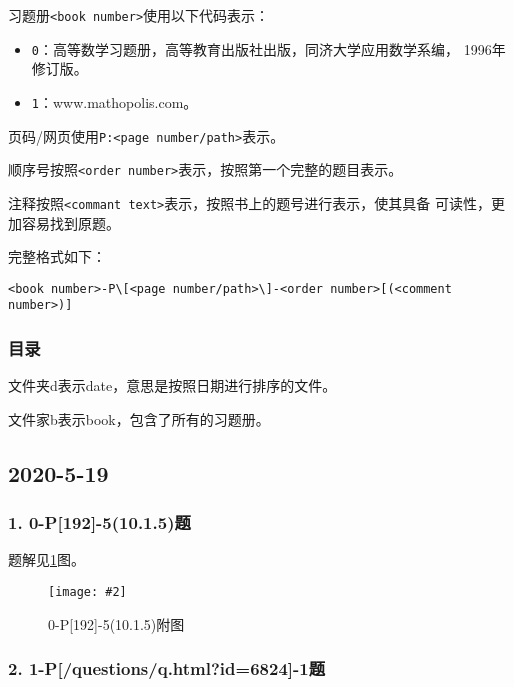 \documentclass[12pt,a4paper,]{article}
\providecommand{\tightlist}{%
  \setlength{\itemsep}{0pt}\setlength{\parskip}{0pt}}
\newcommand{\pic}[4]{
    \begin{figure}[htbp]
    \centering
    \texttt{[image: \#2]}
    \caption{#3}
    \label{#4}
    \end{figure}
}
\begin{document}
习题册\texttt{\textless{}book\ number\textgreater{}}使用以下代码表示：

\begin{itemize}
\tightlist
\item
  \texttt{0}：高等数学习题册，高等教育出版社出版，同济大学应用数学系编，
  1996年修订版。
\item
  \texttt{1}：www.mathopolis.com。
\end{itemize}

页码/网页使用\texttt{P:\textless{}page\ number/path\textgreater{}}表示。

顺序号按照\texttt{\textless{}order\ number\textgreater{}}表示，按照第一个完整的题目表示。

注释按照\texttt{\textless{}commant\ text\textgreater{}}表示，按照书上的题号进行表示，使其具备
可读性，更加容易找到原题。

完整格式如下：
\begin{lstlisting}
<book number>-P\[<page number/path>\]-<order number>[(<comment number>)]
\end{lstlisting}

\hypertarget{ux76eeux5f55}{%
\subsubsection{目录}\label{ux76eeux5f55}}

文件夹d表示date，意思是按照日期进行排序的文件。

文件家b表示book，包含了所有的习题册。

\hypertarget{section}{%
\subsection{2020-5-19}\label{section}}

\hypertarget{p192-510.1.5ux9898}{%
\subsubsection{1. 0-P{[}192{]}-5(10.1.5)题}\label{p192-510.1.5ux9898}}

题解见\ref{0-P[192]-5}图。

\pic{0.85}{./d/2020.5.19/00.jpg}{0-P[192]-5(10.1.5)附图}{0-P[192]-5}

\hypertarget{pquestionsq.htmlid6824-1ux9898}{%
\subsubsection{2.
1-P{[}/questions/q.html?id=6824{]}-1题}\label{pquestionsq.htmlid6824-1ux9898}}
\end{document}
